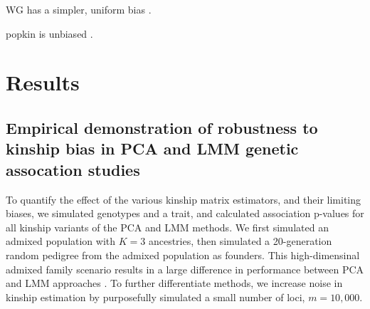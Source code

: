 \documentclass[11pt]{article}
\begin{document}
WG has a simpler, uniform bias \citep{weir_unified_2017, ochoa_estimating_2021}.

popkin is unbiased  \citep{ochoa_estimating_2021}.

\section{Results}

\subsection{Empirical demonstration of robustness to kinship bias in PCA and LMM genetic assocation studies}

To quantify the effect of the various kinship matrix estimators, and their limiting biases, we simulated genotypes and a trait, and calculated association p-values for all kinship variants of the PCA and LMM methods.
We first simulated an admixed population with $K=3$ ancestries, then simulated a 20-generation random pedigree from the admixed population as founders.
This high-dimensinal admixed family scenario results in a large difference in performance between PCA and LMM approaches \citep{yao_testing_2019}.
To further differentiate methods, we increase noise in kinship estimation by purposefully simulated a small number of loci, $m=10,000$.

\graphicspath{ {../data/sim-admix-n1000-m10000-k3-f0.3-s0.5-mc100-h0.8-g20-inv/} }
\end{document}
